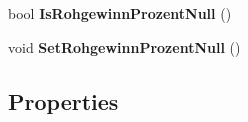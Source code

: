 \begin{DoxyCompactItemize}
\item 
bool {\bfseries Is\+Rohgewinn\+Prozent\+Null} ()\hypertarget{class_products_1_1_data_1_1ds_sage_1_1_kundenumsatz_row_a08c7c03fd74522fd958ccacbe980a06a}{}\label{class_products_1_1_data_1_1ds_sage_1_1_kundenumsatz_row_a08c7c03fd74522fd958ccacbe980a06a}

\item 
void {\bfseries Set\+Rohgewinn\+Prozent\+Null} ()\hypertarget{class_products_1_1_data_1_1ds_sage_1_1_kundenumsatz_row_a2992494feab4f7c03d403438997aa883}{}\label{class_products_1_1_data_1_1ds_sage_1_1_kundenumsatz_row_a2992494feab4f7c03d403438997aa883}

\end{DoxyCompactItemize}
\subsection*{Properties}
